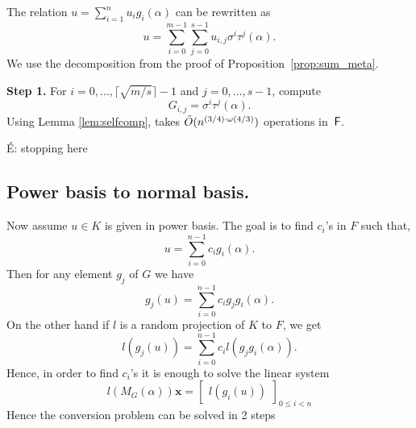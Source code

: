 The relation $u=\sum_{i=1}^n u_i g_i(\alpha)$ can be rewritten as
$$u=\sum_{i = 0}^{m-1} \sum_{j=0}^{s-1} u_{i,j}\sigma^i \tau^j(\alpha).$$
We use the decomposition from the proof of Proposition~\ref{prop:sum_meta}.

\smallskip\noindent\textbf{Step 1.}
For $i=0,\dots,\lceil \sqrt{m/s}
\rceil-1$ and $j=0,\dots,s-1$, compute
$$G_{i,j}=\sigma^i\tau^j(\alpha).$$
Using Lemma \ref{lem:selfcomp}, takes $\tilde{O}(n^{(3/4)\cdot \omega(4/3)})$ operations
in~${\mathsf{F}}$.

\'E: stopping here





\subsection{Power basis to normal basis.}

Now assume $u \in K$ is given in power basis. The goal is to find $c_i$'s in $F$ such that, 
$$u = \sum_{i = 0}^{n-1} c_i g_i(\alpha).$$
Then for any element $g_j$ of $G$ we have
$$g_j(u) = \sum_{i = 0}^{n-1} c_i g_jg_i(\alpha).$$
On the other hand if $l$ is a random projection of $K$ to $F$, we get 
$$l(g_j(u)) = \sum_{i = 0}^{n-1} c_i l(g_jg_i(\alpha)).$$
Hence, in order to find $c_i$'s it is enough to solve the linear system
\begin{equation}\label{eq:convlinsys}
l(M_G(\alpha)) \textbf{x} = \begin{bmatrix} l(g_i(u)) \end{bmatrix}_{0 \leq i <n}
\end{equation}
Hence the conversion problem can be solved in 2 steps 

